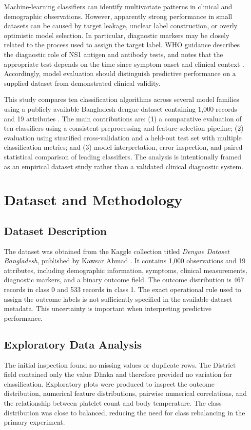\documentclass[conference]{IEEEtran}
\begin{document}
Machine-learning classifiers can identify multivariate patterns in clinical and demographic observations. However, apparently strong performance in small datasets can be caused by target leakage, unclear label construction, or overly optimistic model selection. In particular, diagnostic markers may be closely related to the process used to assign the target label. WHO guidance describes the diagnostic role of NS1 antigen and antibody tests, and notes that the appropriate test depends on the time since symptom onset and clinical context \cite{who_lab2025}. Accordingly, model evaluation should distinguish predictive performance on a supplied dataset from demonstrated clinical validity.

This study compares ten classification algorithms across several model families using a publicly available Bangladesh dengue dataset containing 1,000 records and 19 attributes \cite{kaggle_dengue}. The main contributions are: (1) a comparative evaluation of ten classifiers using a consistent preprocessing and feature-selection pipeline; (2) evaluation using stratified cross-validation and a held-out test set with multiple classification metrics; and (3) model interpretation, error inspection, and paired statistical comparison of leading classifiers. The analysis is intentionally framed as an empirical dataset study rather than a validated clinical diagnostic system.

\section{Dataset and Methodology}
\subsection{Dataset Description}
The dataset was obtained from the Kaggle collection titled \emph{Dengue Dataset Bangladesh}, published by Kawsar Ahmad \cite{kaggle_dengue}. It contains 1,000 observations and 19 attributes, including demographic information, symptoms, clinical measurements, diagnostic markers, and a binary outcome field. The outcome distribution is 467 records in class 0 and 533 records in class 1. The exact operational rule used to assign the outcome labels is not sufficiently specified in the available dataset metadata. This uncertainty is important when interpreting predictive performance.

\subsection{Exploratory Data Analysis}
The initial inspection found no missing values or duplicate rows. The District field contained only the value Dhaka and therefore provided no variation for classification. Exploratory plots were produced to inspect the outcome distribution, numerical feature distributions, pairwise numerical correlations, and the relationship between platelet count and body temperature. The class distribution was close to balanced, reducing the need for class rebalancing in the primary experiment.
\end{document}
